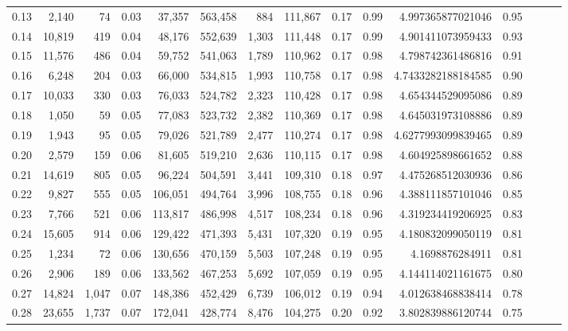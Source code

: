 \begin{tabular}{rrrrrrrrrrrrrrr}
0.13 &   2,140 &     74 &  0.03 &   37,357 &  563,458 &      884 &  111,867 &  0.17 &  0.99 &     4.997365877021046 &      0.95 \\
0.14 &  10,819 &    419 &  0.04 &   48,176 &  552,639 &    1,303 &  111,448 &  0.17 &  0.99 &     4.901411073959433 &      0.93 \\
0.15 &  11,576 &    486 &  0.04 &   59,752 &  541,063 &    1,789 &  110,962 &  0.17 &  0.98 &     4.798742361486816 &      0.91 \\
0.16 &   6,248 &    204 &  0.03 &   66,000 &  534,815 &    1,993 &  110,758 &  0.17 &  0.98 &    4.7433282188184585 &      0.90 \\
0.17 &  10,033 &    330 &  0.03 &   76,033 &  524,782 &    2,323 &  110,428 &  0.17 &  0.98 &     4.654344529095086 &      0.89 \\
0.18 &   1,050 &     59 &  0.05 &   77,083 &  523,732 &    2,382 &  110,369 &  0.17 &  0.98 &     4.645031973108886 &      0.89 \\
0.19 &   1,943 &     95 &  0.05 &   79,026 &  521,789 &    2,477 &  110,274 &  0.17 &  0.98 &    4.6277993099839465 &      0.89 \\
0.20 &   2,579 &    159 &  0.06 &   81,605 &  519,210 &    2,636 &  110,115 &  0.17 &  0.98 &     4.604925898661652 &      0.88 \\
0.21 &  14,619 &    805 &  0.05 &   96,224 &  504,591 &    3,441 &  109,310 &  0.18 &  0.97 &     4.475268512030936 &      0.86 \\
0.22 &   9,827 &    555 &  0.05 &  106,051 &  494,764 &    3,996 &  108,755 &  0.18 &  0.96 &     4.388111857101046 &      0.85 \\
0.23 &   7,766 &    521 &  0.06 &  113,817 &  486,998 &    4,517 &  108,234 &  0.18 &  0.96 &     4.319234419206925 &      0.83 \\
0.24 &  15,605 &    914 &  0.06 &  129,422 &  471,393 &    5,431 &  107,320 &  0.19 &  0.95 &     4.180832099050119 &      0.81 \\
0.25 &   1,234 &     72 &  0.06 &  130,656 &  470,159 &    5,503 &  107,248 &  0.19 &  0.95 &       4.1698876284911 &      0.81 \\
0.26 &   2,906 &    189 &  0.06 &  133,562 &  467,253 &    5,692 &  107,059 &  0.19 &  0.95 &     4.144114021161675 &      0.80 \\
0.27 &  14,824 &  1,047 &  0.07 &  148,386 &  452,429 &    6,739 &  106,012 &  0.19 &  0.94 &     4.012638468838414 &      0.78 \\
0.28 &  23,655 &  1,737 &  0.07 &  172,041 &  428,774 &    8,476 &  104,275 &  0.20 &  0.92 &     3.802839886120744 &      0.75 \\

\end{tabular}
